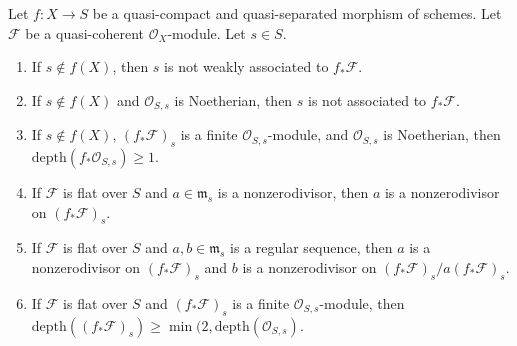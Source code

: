\begin{lemma}
\label{lemma-depth-pushforward}
Let $f : X \to S$ be a quasi-compact and quasi-separated morphism of schemes.
Let $\mathcal{F}$ be a quasi-coherent $\mathcal{O}_X$-module.
Let $s \in S$.
\begin{enumerate}
\item If $s \not \in f(X)$, then $s$ is not weakly associated
to $f_*\mathcal{F}$.
\item If $s \not \in f(X)$ and $\mathcal{O}_{S, s}$ is Noetherian,
then $s$ is not associated to $f_*\mathcal{F}$.
\item If $s \not \in f(X)$, $(f_*\mathcal{F})_s$ is a finite
$\mathcal{O}_{S, s}$-module, and $\mathcal{O}_{S, s}$
is Noetherian, then $\text{depth}(f_*\mathcal{O}_{S, s}) \geq 1$.
\item If $\mathcal{F}$ is flat over $S$ and $a \in \mathfrak m_s$
is a nonzerodivisor, then $a$ is a nonzerodivisor on $(f_*\mathcal{F})_s$.
\item If $\mathcal{F}$ is flat over $S$ and $a, b \in \mathfrak m_s$
is a regular sequence, then $a$ is a nonzerodivisor on $(f_*\mathcal{F})_s$
and $b$ is a nonzerodivisor on $(f_*\mathcal{F})_s/a(f_*\mathcal{F})_s$.
\item If $\mathcal{F}$ is flat over $S$ and $(f_*\mathcal{F})_s$
is a finite $\mathcal{O}_{S, s}$-module, then
$\text{depth}((f_*\mathcal{F})_s) \geq
\min(2, \text{depth}(\mathcal{O}_{S, s})$.
\end{enumerate}
\end{lemma}

